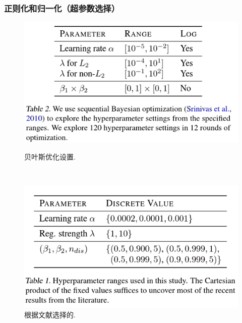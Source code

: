\documentclass{beamer}
\begin{document}
\begin{frame}[c]\frametitle{正则化和归一化（超参数选择）}
    \begin{figure}[h]
        \begin{minipage}[t]{0.4\linewidth}%
        \centering     %
        \includegraphics[width=1.2\textwidth]{hyperParmetersWithBayes.png}
        \caption{贝叶斯优化设置.}%
        \end{minipage} 
        \hfill
        \begin{minipage}[t]{0.4\linewidth}
        \centering
        \includegraphics[width=1.2\textwidth]{hyperParmetersWithLiterature.png}
        \caption{根据文献选择的.}%
        \end{minipage}
    \end{figure}
\end{frame}
\end{document}
